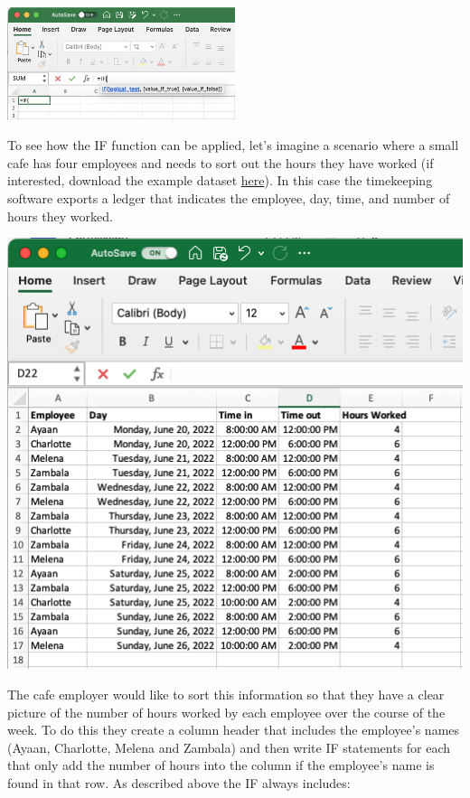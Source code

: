 \documentclass[
]{book}
\begin{document}
\includegraphics[width=0.5\textwidth,height=\textheight]{images/ifstatement2.png}

To see how the IF function can be applied, let's imagine a scenario where a small cafe has four employees and needs to sort out the hours they have worked (if interested, download the example dataset \href{./datasets/If_Statements.csv}{here}). In this case the timekeeping software exports a ledger that indicates the employee, day, time, and number of hours they worked.

\includegraphics{images/employees.png}

The cafe employer would like to sort this information so that they have a clear picture of the number of hours worked by each employee over the course of the week. To do this they create a column header that includes the employee's names (Ayaan, Charlotte, Melena and Zambala) and then write IF statements for each that only add the number of hours into the column if the employee's name is found in that row. As described above the IF always includes:
\end{document}

